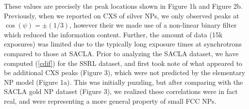 \documentclass [11pt,fleqn]{article}
\begin{document}
These values are precisely the peak locations shown in Figure 1h and Figure 2b. Previously, when we reported on CXS of silver NPs, we only observed peaks at $\cos(\psi) = \pm (1/3)$, however their we made use of a non-linear binary filter which reduced the information content. Further, the amount of data (15k exposures) was limited due to the typically long exposure times at synchrotrons compared to those at SACLA. Prior to analyzing the SACLA dataset, we have computed (\ref{cdif}) for the SSRL dataset, and first took note of what appeared to be additional CXS peaks (Figure 3), which were not predicted by the elementary NP model (Figure 1a). This was initially puzzling, but after comparing with the SACLA gold NP dataset (Figure 3), we realized these correlations were in fact real, and were representing a more general property of small FCC NPs.
\end{document}
